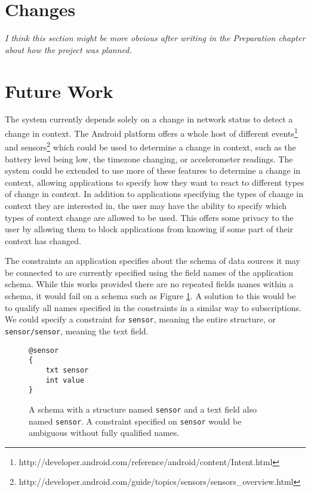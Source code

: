 \documentclass[12pt,twoside,notitlepage]{report}
\begin{document}
\section{Changes}
{\sl I think this section might be more obvious after writing in the Preparation chapter about how the project was planned. }


\section{Future Work}

The system currently depends solely on a change in network status to detect a change in context. 
The Android platform offers a whole host of different events\footnote{http://developer.android.com/reference/android/content/Intent.html} and sensors\footnote{http://developer.android.com/guide/topics/sensors/sensors\_overview.html} which could be used to determine a change in context, such as the battery level being low, the timezone changing, or accelerometer readings. 
The system could be extended to use more of these features to determine a change in context, allowing applications to specify how they want to react to different types of change in context. 
In addition to applications specifying the types of change in context they are interested in, the user may have the ability to specify which types of context change are allowed to be used. 
This offers some privacy to the user by allowing them to block applications from knowing if some part of their context has changed.

The constraints an application specifies about the schema of data sources it may be connected to are currently specified using the field names of the application schema.
While this works provided there are no repeated fields names within a schema, it would fail on a schema such as Figure \ref{fig:repeatednameschema}. 
A solution to this would be to qualify all names specified in the constraints in a similar way to subscriptions. 
We could specify a constraint for {\tt sensor}, meaning the entire structure, or {\tt sensor/sensor}, meaning the text field.

\begin{figure}[h]
\begin{lstlisting}
@sensor
{
	txt sensor
	int value
}
\end{lstlisting}
\caption[Schema with repeated name]{A schema with a structure named {\tt sensor} and a text field also named {\tt sensor}. A constraint specified on {\tt sensor} would be ambiguous without fully qualified names.}
\label{fig:repeatednameschema}
\end{figure}
\end{document}
